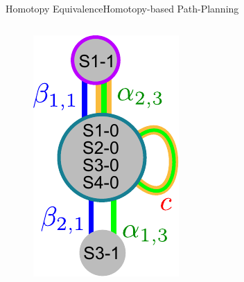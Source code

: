 \begin{frame}{Homotopy Equivalence}{Homotopy-based Path-Planning}
\begin{columns}
\begin{figure}
	\includegraphics[width=\linewidth]{figure/obs_topology2}
\end{figure}
\end{columns}

\end{frame}

